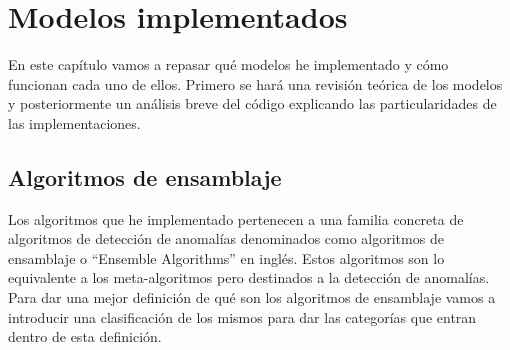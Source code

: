 \chapter{Modelos implementados}
\label{chapter:modelos}

En este capítulo vamos a repasar qué modelos he implementado y cómo funcionan cada uno de ellos. Primero se hará una revisión teórica de los modelos y posteriormente un análisis breve del código explicando las particularidades de las implementaciones.

\section{Algoritmos de ensamblaje}

Los algoritmos que he implementado pertenecen a una familia concreta de algoritmos de detección de anomalías denominados como algoritmos de ensamblaje o ``Ensemble Algorithms'' en inglés. Estos algoritmos son lo equivalente a los meta-algoritmos pero destinados a la detección de anomalías. Para dar una mejor definición de qué son los algoritmos de ensamblaje vamos a introducir una clasificación de los mismos para dar las categorías que entran dentro de esta definición.

